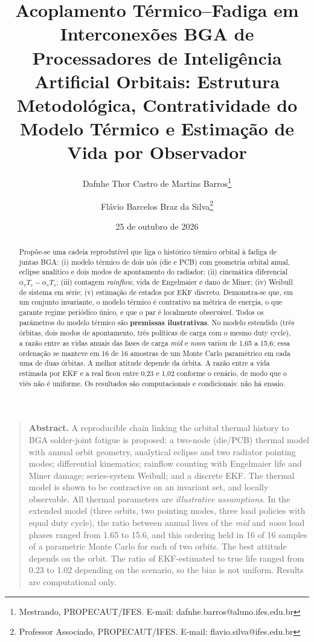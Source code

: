 \documentclass[12pt,a4paper]{article}
\title{Acoplamento Térmico--Fadiga em Interconexões BGA de Processadores de
Inteligência Artificial Orbitais: Estrutura Metodológica, Contratividade do
Modelo Térmico e Estimação de Vida por Observador}
\author{Dafnhe Thor Castro de Martins Barros\thanks{Mestrando, PROPECAUT/IFES.
E-mail: dafnhe.barros@aluno.ifes.edu.br}\and
Flávio Barcelos Braz da Silva\thanks{Professor Associado, PROPECAUT/IFES.
E-mail: flavio.silva@ifes.edu.br}}
\date{25 de outubro de 2026}
\begin{document}
\maketitle

\begin{abstract}
Propõe-se uma cadeia reprodutível que liga o histórico térmico orbital à fadiga
de juntas BGA: (i) modelo térmico de dois nós (die e PCB) com geometria orbital
anual, eclipse analítico e dois modos de apontamento do radiador; (ii)
cinemática diferencial $\alpha_cT_c-\alpha_sT_s$; (iii) contagem
\emph{rainflow}, vida de Engelmaier e dano de Miner; (iv) Weibull de sistema em
série; (v) estimação de estados por EKF discreto. Demonstra-se que, em um
conjunto invariante, o modelo térmico é contrativo na métrica de energia, o que
garante regime periódico único, e que o par é localmente observável. Todos os
parâmetros do modelo térmico são \textbf{premissas ilustrativas}. No modelo
estendido (três órbitas, dois modos de apontamento, três políticas de carga com
o mesmo duty cycle), a razão entre as vidas anuais das fases de carga
\emph{mid} e \emph{noon} variou de 1,65 a 15,6; essa ordenação se manteve em
16 de 16 amostras de um Monte Carlo paramétrico em cada uma de duas órbitas. A
melhor atitude depende da órbita. A razão entre a vida estimada por EKF e a
real ficou entre 0,23 e 1,02 conforme o cenário, de modo que o viés não é
uniforme. Os resultados são computacionais e condicionais: não há ensaio.
\end{abstract}

\begin{quote}\small
\textbf{Abstract.} A reproducible chain linking the orbital thermal history to
BGA solder-joint fatigue is proposed: a two-node (die/PCB) thermal model with
annual orbit geometry, analytical eclipse and two radiator pointing modes;
differential kinematics; rainflow counting with Engelmaier life and Miner
damage; series-system Weibull; and a discrete EKF. The thermal model is shown
to be contractive on an invariant set, and locally observable. All thermal
parameters are \emph{illustrative assumptions}. In the extended model (three
orbits, two pointing modes, three load policies with equal duty cycle), the
ratio between annual lives of the \emph{mid} and \emph{noon} load phases ranged
from 1.65 to 15.6, and this ordering held in 16 of 16 samples of a parametric
Monte Carlo for each of two orbits. The best attitude depends on the orbit. The
ratio of EKF-estimated to true life ranged from 0.23 to 1.02 depending on the
scenario, so the bias is not uniform. Results are computational only.
\end{quote}
\end{document}
